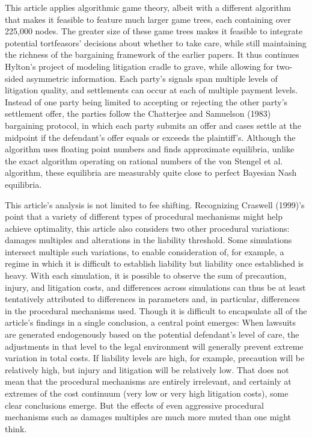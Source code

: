 \documentclass{article}
\begin{document}
This article applies algorithmic game theory, albeit with a different algorithm that makes it feasible to feature much larger game trees, each containing over 225,000 nodes. The greater size of these game trees makes it feasible to integrate potential tortfeasors' decisions about whether to take care, while still maintaining the richness of the bargaining framework of the earlier papers. It thus continues Hylton's project of modeling litigation cradle to grave, while allowing for two-sided asymmetric information. Each party's signals span multiple levels of litigation quality, and settlements can occur at each of multiple payment levels. Instead of one party being limited to accepting or rejecting the other party's settlement offer, the parties follow the Chatterjee and Samuelson (1983) bargaining protocol, in which each party submits an offer and cases settle at the midpoint if the defendant's offer equals or exceeds the plaintiff's. Although the algorithm uses floating point numbers and finds approximate equilibria, unlike the exact algorithm operating on rational numbers of the von Stengel et al. algorithm, these equilibria are measurably quite close to perfect Bayesian Nash equilibria. 

This article's analysis is not limited to fee shifting. Recognizing Craswell (1999)'s point that a variety of different types of procedural mechanisms might help achieve optimality, this article also considers two other procedural variations: damages multiples and alterations in the liability threshold. Some simulations intersect multiple such variations, to enable consideration of, for example, a regime in which it is difficult to establish liability but liability once established is heavy. With each simulation, it is possible to observe the sum of precaution, injury, and litigation costs, and differences across simulations can thus be at least tentatively attributed to differences in parameters and, in particular, differences in the procedural mechanisms used. Though it is difficult to encapsulate all of the article's findings in a single conclusion, a central point emerges: When lawsuits are generated endogenously based on the potential defendant's level of care, the adjustments in that level to the legal environment will generally prevent extreme variation in total costs. If liability levels are high, for example, precaution will be relatively high, but injury and litigation will be relatively low. That does not mean that the procedural mechanisms are entirely irrelevant, and certainly at extremes of the cost continuum (very low or very high litigation costs), some clear conclusions emerge. But the effects of even aggressive procedural mechanisms such as damages multiples are much more muted than one might think. 
\end{document}
